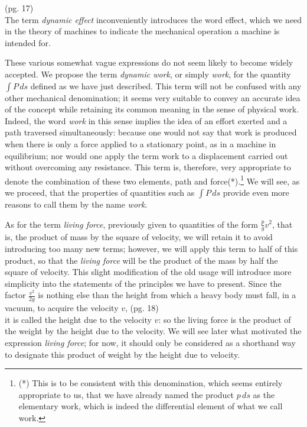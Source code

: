 \documentclass{book}
\begin{document}
\newpage
(pg. 17)\\
The term \textit{dynamic effect} inconveniently introduces the word effect, which we need in the theory of machines to indicate the mechanical operation a machine is intended for.

These various somewhat vague expressions do not seem likely to become widely accepted. We propose the term \textit{dynamic work}, or simply \textit{work}, for the quantity \(\int P \, ds\) defined as we have just described. This term will not be confused with any other mechanical denomination; it seems very suitable to convey an accurate idea of the concept while retaining its common meaning in the sense of physical work. Indeed, the word \textit{work} in this sense implies the idea of an effort exerted and a path traversed simultaneously: because one would not say that work is produced when there is only a force applied to a stationary point, as in a machine in equilibrium; nor would one apply the term work to a displacement carried out without overcoming any resistance. This term is, therefore, very appropriate to denote the combination of these two elements, path and force(*).\footnote{(*) This is to be consistent with this denomination, which seems entirely appropriate to us, that we have already named the product \(p \, ds\) as the elementary work, which is indeed the differential element of what we call work.
} We will see, as we proceed, that the properties of quantities such as \(\int P \, ds\) provide even more reasons to call them by the name \textit{work}.

As for the term \textit{living force}, previously given to quantities of the form \(\frac{p}{g} v^2\), that is, the product of mass by the square of velocity, we will retain it to avoid introducing too many new terms; however, we will apply this term to half of this product, so that the \textit{living force} will be the product of the mass by half the square of velocity. This slight modification of the old usage will introduce more simplicity into the statements of the principles we have to present. Since the factor \(\frac{v^2}{2g}\) is nothing else than the height from which a heavy body must fall, in a vacuum, to acquire the velocity \(v\), 
\newpage
(pg. 18)\\
it is called the height due to the velocity \(v\): so the living force is the product of the weight by the height due to the velocity. We will see later what motivated the expression \textit{living force}; for now, it should only be considered as a shorthand way to designate this product of weight by the height due to velocity.
\end{document}

